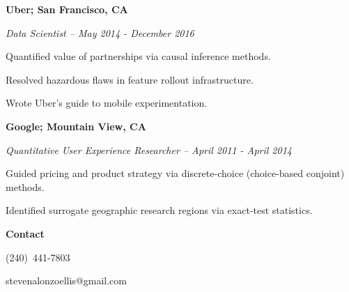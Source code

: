 \documentclass[12pt]{res}
\begin{document}
{\begin{resume}
\begin{minipage}{7.6in}
\vspace{2mm}
\textbf{Uber; San Francisco, CA}

{\it Data Scientist -- May  2014 - December  2016}
\vspace{0.5mm}
\begin{list}{}{\leftmargin=1em}\itemsep-2pt
\item Quantified value of partnerships via causal inference methods.
\item Resolved hazardous flaws in feature rollout infrastructure.
\item Wrote Uber's guide to mobile experimentation.
\end{list}

\vspace{2mm}
\textbf{Google; Mountain View, CA}

{\it Quantitative User Experience Researcher -- April  2011 - April  2014}  
\vspace{0.5mm}
\begin{list}{}{\leftmargin=1em}\itemsep-2pt
\item Guided pricing and product strategy via discrete-choice (choice-based conjoint) methods.
\item Identified surrogate geographic research regions via exact-test statistics.
\end{list}

\vspace{2mm}

\textbf{Contact\hspace{1mm}}\hrulefill
\vspace{2mm}
\begin{list}{}{\leftmargin=1em}\itemsep-2pt
\item (240)~441-7803
\item stevenalonzoellis@gmail.com
\end{list}


\end{minipage}
\end{resume}
} %
\end{document}
